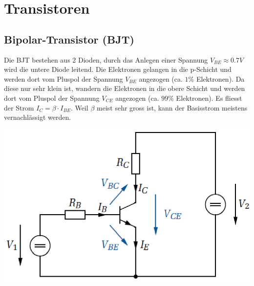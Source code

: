 \section{Transistoren}

\subsection{Bipolar-Transistor (BJT)}
Die BJT bestehen aus 2 Dioden, durch das Anlegen einer Spannung $V_{BE} \approx 0.7V$ wird die untere Diode leitend. 
Die Elektronen gelangen in die p-Schicht und werden dort vom Pluspol der Spannung $V_{BE}$ angezogen (ca. $1\%$ Elektronen). Da diese nur sehr klein ist, wandern die Elektronen 
in die obere Schicht und werden dort vom Pluspol der Spannung $V_{CE}$ angezogen (ca. $99\%$ Elektronen). Es fliesst der Strom $I_C = \beta \cdot I_{BE}$. Weil $\beta$ meist sehr gross ist, 
kann der Basisstrom meistens vernachlässigt werden.

\begin{center}
	\includegraphics[width=0.5\columnwidth]{Images/bipolar}
\end{center}


